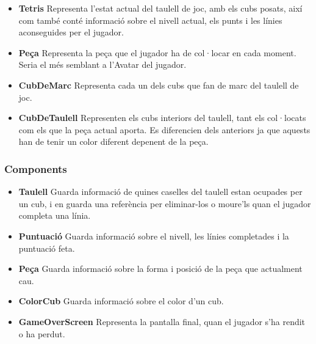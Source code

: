       \begin{itemize}
        \item {\bf Tetris}
          Representa l'estat actual del taulell de joc, amb els cubs posats, així com també conté informació sobre el nivell actual, els punts i les línies aconseguides per el jugador.
          
        \item {\bf Peça}
          Representa la peça que el jugador ha de col·locar en cada moment. Seria el més semblant a l'Avatar del jugador.
          
        \item {\bf CubDeMarc}
          Representa cada un dels cubs que fan de marc del taulell de joc.
          
        \item {\bf CubDeTaulell}
          Representen els cubs interiors del taulell, tant els col·locats com els que la peça actual aporta. Es diferencien dels anteriors ja que aquests han de tenir un color diferent depenent de la peça.
          
      \end{itemize}

    \subsubsection{Components}

      \begin{itemize}
        \item {\bf Taulell}
          Guarda informació de quines caselles del taulell estan ocupades per un cub, i en guarda una referència per eliminar-los o moure'ls quan el jugador completa una línia.
          
        \item {\bf Puntuació}
          Guarda informació sobre el nivell, les línies completades i la puntuació feta.
          
        \item {\bf Peça}
          Guarda informació sobre la forma i posició de la peça que actualment cau.
          
        \item {\bf ColorCub}
          Guarda informació sobre el color d'un cub.
          
        \item {\bf GameOverScreen}
          Representa la pantalla final, quan el jugador s'ha rendit o ha perdut.
          
      \end{itemize}

